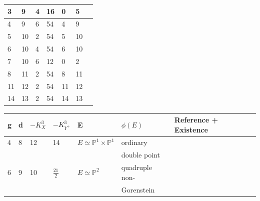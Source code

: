 \documentclass[english,11pt,reqno]{amsart}
\newcommand{\Ptwo}{\mathbb{P}^2}
\newcommand{\PxP}{\mathbb{P}^1 \times \mathbb{P}^1}
\begin{document}
\begin{table}[H]
\begin{minipage}[h]{\textwidth}
\begin{tabular}{|l|l|l|l|l|l|l|}
\hline
3 & 9 & 4 & 16 & 0 & 5 & \cite[No.\ 70, Thm.\ 3.2]{Arap_Cutrone_Marshburn_weak_Fano_threefolds_Existence} \\
\hline
4 & 9 & 6 & 54 & 4 & 9 & \cite[No.\ 88, Thm.\ 3.2]{Arap_Cutrone_Marshburn_weak_Fano_threefolds_Existence}\\
\hline
5 & 10 & 2 & 54 & 5 & 10 & \cite[No.\ 45, Thm.\ 3.2]{Arap_Cutrone_Marshburn_weak_Fano_threefolds_Existence}\\
\hline 
6 & 10 &  4 & 54 & 6 & 10 & \cite[No.\ 72, Thm.\ 4.1]{Cutrone_Marshburn_Update} \\
\hline
7 & 10 & 6 & 12 & 0 & 2 & \cite[(2.8)]{Takeuchi_Some_birational_maps} \\
\hline
8 & 11 & 2 & 54 & 8 & 11 & \cite[No.\ 46, Thm.\ 3.2]{Arap_Cutrone_Marshburn_weak_Fano_threefolds_Existence} \\
\hline 
11 & 12 & 2 & 54 & 11 & 12 & \cite[No.\ 47, Thm.\ 4.1]{Cutrone_Marshburn_Update} \\ 
\hline 
14 & 13 & 2 & 54 & 14 & 13 & \cite[No.\ 48, Thm.\ 3.2]{Arap_Cutrone_Marshburn_weak_Fano_threefolds_Existence}\\
\hline
\end{tabular}		\par
\vspace{1cm}
\begin{tabular}{|l|l|l|l|l|l|l|}
\hline
g&d&$-K_X^3$&$-K_{Y^+}^3$ & E& $\phi(E)$ & Reference + Existence \\
\hline 
4&8&12&14 &$E\simeq \PxP$& ordinary & \cite[3.2.2, No.\ 5]{Cutrone_Marshburn_Classification}\\
& & & & & double point& \\
\hline
6 &9&10& $\frac{21}{2}$ & $E\simeq \Ptwo$& quadruple non- & \cite[3.2.3, No.\ 5]{Cutrone_Marshburn_Classification} \\
& & & & & Gorenstein &\\
\hline
\end{tabular}
\end{minipage}
\end{table}
% 
\end{document}
